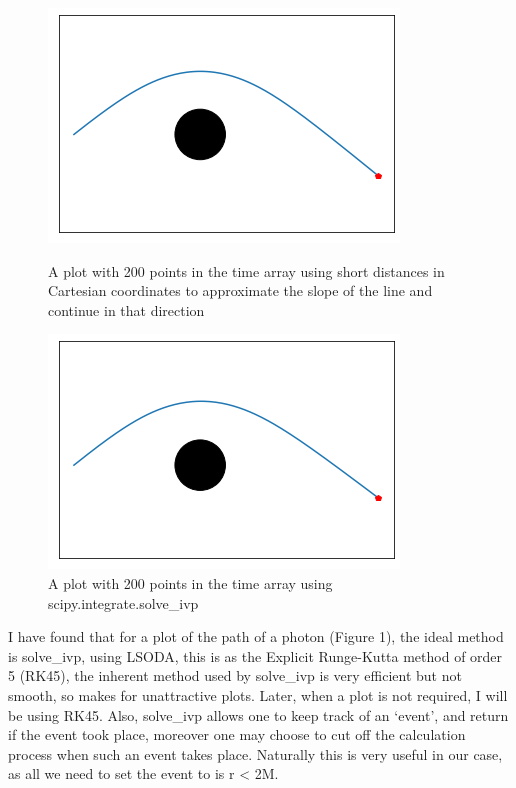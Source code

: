 \documentclass[oneside,openright,frontopenright]{dmathesis}
\begin{document}
\begin{figure}
	\centering
	\begin{minipage}[b]{0.6\textwidth}
		\includegraphics[width=\textwidth]{img/points200byhand}
		\caption{A plot with 200 points in the time array using short distances in Cartesian coordinates to approximate the slope of the line and continue in that direction}
	\end{minipage}
	\hfill
	\begin{minipage}[b]{0.6\textwidth}
		\includegraphics[width=\textwidth]{img/points200scipy}
		\caption{A plot with 200 points in the time array using scipy.integrate.solve\_ivp}
	\end{minipage}
\end{figure}


	I have found that for a plot of the path of a photon (Figure 1), the ideal method is solve\_ivp\cite{2020SciPy-NMeth}, using LSODA\cite{hindmarsh2005lsoda}, this is as the Explicit Runge-Kutta method of order 5 (RK45)\cite{fehlberg1969low}, the inherent method used by solve\_ivp is very efficient but not smooth, so makes for unattractive plots. Later, when a plot is not required, I will be using RK45. Also, solve\_ivp allows one to keep track of an ‘event’, and return if the event took place, moreover one may choose to cut off the calculation process when such an event takes place. Naturally this is very useful in our case, as all we need to set the event to is r < 2M.
\end{document}
